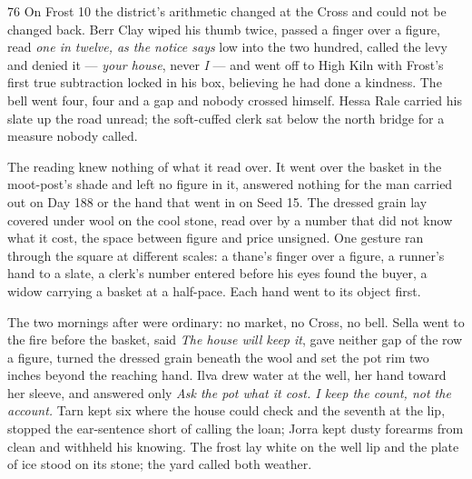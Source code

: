 
\scenebreak


\scenebreak


\scenebreak

\CRtailpiece
\begin{CRchronicle}{76}
On Frost 10 the district’s arithmetic changed at the Cross and could not be changed back. Berr Clay wiped his thumb twice, passed a finger over a figure, read \emph{one in twelve, as the notice says} low into the two hundred, called the levy and denied it --- \emph{your house}, never \emph{I} --- and went off to High Kiln with Frost’s first true subtraction locked in his box, believing he had done a kindness. The bell went four, four and a gap and nobody crossed himself. Hessa Rale carried his slate up the road unread; the soft-cuffed clerk sat below the north bridge for a measure nobody called.

The reading knew nothing of what it read over. It went over the basket in the moot-post’s shade and left no figure in it, answered nothing for the man carried out on Day 188 or the hand that went in on Seed 15. The dressed grain lay covered under wool on the cool stone, read over by a number that did not know what it cost, the space between figure and price unsigned. One gesture ran through the square at different scales: a thane’s finger over a figure, a runner’s hand to a slate, a clerk’s number entered before his eyes found the buyer, a widow carrying a basket at a half-pace. Each hand went to its object first.

The two mornings after were ordinary: no market, no Cross, no bell. Sella went to the fire before the basket, said \emph{The house will keep it}, gave neither gap of the row a figure, turned the dressed grain beneath the wool and set the pot rim two inches beyond the reaching hand. Ilva drew water at the well, her hand toward her sleeve, and answered only \emph{Ask the pot what it cost. I keep the count, not the account.} Tarn kept six where the house could check and the seventh at the lip, stopped the ear-sentence short of calling the loan; Jorra kept dusty forearms from clean and withheld his knowing. The frost lay white on the well lip and the plate of ice stood on its stone; the yard called both weather.


\end{CRchronicle}
